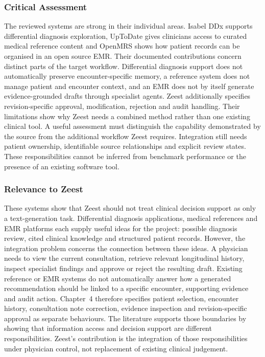 \subsubsection{Critical Assessment}

The reviewed systems are strong in their individual areas. Isabel DDx supports differential diagnosis exploration, UpToDate gives clinicians access to curated medical reference content and OpenMRS shows how patient records can be organised in an open source EMR. Their documented contributions concern distinct parts of the target workflow. Differential diagnosis support does not automatically preserve encounter-specific memory, a reference system does not manage patient and encounter context, and an EMR does not by itself generate evidence-grounded drafts through specialist agents. Zeest additionally specifies revision-specific approval, modification, rejection and audit handling. Their limitations show why Zeest needs a combined method rather than one existing clinical tool. A useful assessment must distinguish the capability demonstrated by the source from the additional workflow Zeest requires. Integration still needs patient ownership, identifiable source relationships and explicit review states. These responsibilities cannot be inferred from benchmark performance or the presence of an existing software tool.

\subsubsection{Relevance to Zeest}

These systems show that Zeest should not treat clinical decision support as only a text-generation task. Differential diagnosis applications, medical references and EMR platforms each supply useful ideas for the project: possible diagnosis review, cited clinical knowledge and structured patient records. However, the integration problem concerns the connection between these ideas. A physician needs to view the current consultation, retrieve relevant longitudinal history, inspect specialist findings and approve or reject the resulting draft. Existing reference or EMR systems do not automatically answer how a generated recommendation should be linked to a specific encounter, supporting evidence and audit action. Chapter~4 therefore specifies patient selection, encounter history, consultation note correction, evidence inspection and revision-specific approval as separate behaviours. The literature supports those boundaries by showing that information access and decision support are different responsibilities. Zeest's contribution is the integration of those responsibilities under physician control, not replacement of existing clinical judgement.

